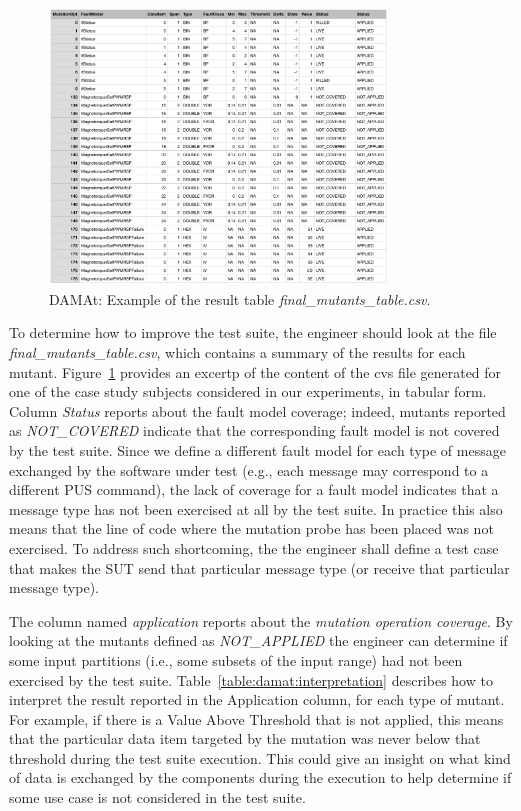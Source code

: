  
 \begin{figure}[h]
\begin{center}
\includegraphics[width=0.8\textwidth]{images/DAMAtADCS.png}
\caption{DAMAt: Example of the result table \emph{final\_mutants\_table.csv}.}
\label{fig:damat:example:result:table}
\end{center}
\end{figure}

To determine how to improve the test suite, the engineer should look at the file \emph{final\_mutants\_table.csv}, which contains a summary of the results for each mutant. Figure~\ref{fig:damat:example:result:table} provides an excertp of the content of the cvs file generated for one of the case study subjects considered in our experiments, in tabular form. Column \emph{Status} reports about  the fault model coverage; indeed, mutants reported as \emph{NOT\_COVERED} indicate that the corresponding fault model is not covered by the test suite. Since we define a different fault model for each type of message exchanged by the software under test (e.g., each message may correspond to a different PUS command), the lack of coverage for a fault model indicates that a message type has not been exercised at all by the test suite. In practice this also means that the line of code where the mutation probe has been placed was not exercised.
To address such shortcoming, the the engineer shall define a test case that makes the SUT send that particular message type (or receive that particular message type).

The column named \emph{application} reports about the \emph{mutation operation coverage}. By looking at the mutants defined as \emph{NOT\_APPLIED} the engineer can determine if some input partitions (i.e., some subsets of the input range) had not been exercised by the test suite. Table~\ref{table:damat:interpretation} describes how to interpret the result reported in the Application column, for each type of mutant.
For example, if there is a Value Above Threshold that is not applied, this means that the particular data item targeted by the mutation was never below that threshold during the test suite execution. 
This could give an insight on what kind of data is exchanged by the components during the execution to help determine if some use case is not considered in the test suite. 

